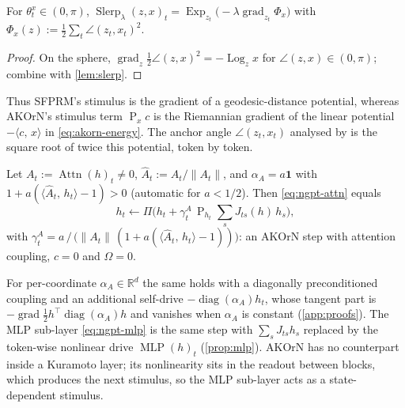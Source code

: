 \documentclass{article}
\theoremstyle{plain}
\theoremstyle{definition}
\theoremstyle{remark}
\newcommand{\R}{\mathbb{R}}
\newcommand{\ip}[2]{\langle #1,\, #2\rangle}
\newcommand{\norm}[1]{\lVert #1\rVert}
\newcommand{\Proj}{\operatorname{P}}
\newcommand{\Ret}{\Pi}
\newcommand{\Slerp}{\operatorname{Slerp}}
\newcommand{\Exp}{\operatorname{Exp}}
\newcommand{\Log}{\operatorname{Log}}
\newcommand{\Attn}{\operatorname{Attn}}
\newcommand{\MLP}{\operatorname{MLP}}
\newcommand{\diag}{\operatorname{diag}}
\newcommand{\grad}{\operatorname{grad}}
\begin{document}
\begin{proposition}
\label{prop:injection-gradient}
For $\theta^x_t\in(0,\pi)$, $\Slerp_\lambda(z,x)_t=\Exp_{z_t}\big(-\lambda\grad_{z_t}\Phi_x\big)$ with
$\Phi_x(z):=\tfrac12\sum_t\angle(z_t,x_t)^2$.
\end{proposition}
\begin{proof}
On the sphere, $\grad_z\tfrac12\angle(z,x)^2=-\Log_zx$ for $\angle(z,x)\in(0,\pi)$; combine with
\cref{lem:slerp}.
\end{proof}

Thus SFPRM's stimulus is the gradient of a geodesic-distance potential, whereas AKOrN's stimulus term
$\Proj_xc$ is the Riemannian gradient of the linear potential $-\ip{c}{x}$ in
\eqref{eq:akorn-energy}. The anchor angle $\angle(z_t,x_t)$ analysed by \citet{sfprm} is the square
root of twice this potential, token by token.

\begin{proposition}
\label{prop:attention}
Let $A_t:=\Attn(h)_t\neq0$, $\hat A_t:=A_t/\norm{A_t}$, and $\alpha_A=a\mathbf 1$ with
$1+a(\ip{\hat A_t}{h_t}-1)>0$ (automatic for $a<1/2$). Then \eqref{eq:ngpt-attn} equals
\begin{equation}
  h_t \leftarrow \Ret\Big(h_t + \gamma^A_t\,\Proj_{h_t}\sum_s J_{ts}(h)\,h_s\Big),
\end{equation}
with $\gamma^A_t = a\,/\,\big(\norm{A_t}\,(1 + a(\ip{\hat A_t}{h_t}-1))\big)$: an AKOrN step with
attention coupling, $c=0$ and $\Omega=0$.
\end{proposition}

For per-coordinate $\alpha_A\in\R^d$ the same holds with a diagonally preconditioned coupling and an
additional self-drive $-\diag(\alpha_A)h_t$, whose tangent part is
$-\grad\tfrac12h^\top\diag(\alpha_A)h$ and vanishes when $\alpha_A$ is constant
(\cref{app:proofs}). The MLP sub-layer \eqref{eq:ngpt-mlp} is the same step with $\sum_sJ_{ts}h_s$
replaced by the token-wise nonlinear drive $\MLP(h)_t$ (\cref{prop:mlp}). AKOrN has no counterpart
inside a Kuramoto layer; its nonlinearity sits in the readout between blocks, which produces the next
stimulus, so the MLP sub-layer acts as a state-dependent stimulus.
\end{document}
